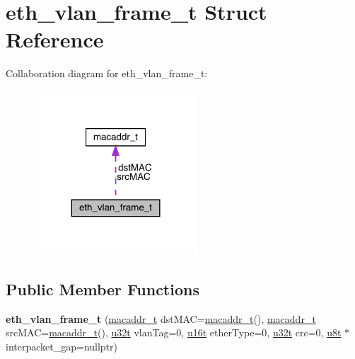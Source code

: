 \hypertarget{structeth__vlan__frame__t}{}\section{eth\+\_\+vlan\+\_\+frame\+\_\+t Struct Reference}
\label{structeth__vlan__frame__t}


Collaboration diagram for eth\+\_\+vlan\+\_\+frame\+\_\+t\+:\nopagebreak
\begin{figure}[H]
\begin{center}
\leavevmode
\includegraphics[width=173pt]{structeth__vlan__frame__t__coll__graph}
\end{center}
\end{figure}
\subsection*{Public Member Functions}
\begin{DoxyCompactItemize}
\item 
\mbox{\label{structeth__vlan__frame__t_afd8ff79bdc0fd97dd158d1b0e6842363}} 
{\bfseries eth\+\_\+vlan\+\_\+frame\+\_\+t} (\hyperlink{structmacaddr__t}{macaddr\+\_\+t} dst\+M\+AC=\hyperlink{structmacaddr__t}{macaddr\+\_\+t}(), \hyperlink{structmacaddr__t}{macaddr\+\_\+t} src\+M\+AC=\hyperlink{structmacaddr__t}{macaddr\+\_\+t}(), \hyperlink{macros_8h_a464a07ed2c6d005d677113cc44750a64}{u32t} vlan\+Tag=0, \hyperlink{macros_8h_a590a9a8f7df8fabfac6573e21da1922d}{u16t} ether\+Type=0, \hyperlink{macros_8h_a464a07ed2c6d005d677113cc44750a64}{u32t} crc=0, \hyperlink{macros_8h_a176a4ab0531a048e0693a4520c550193}{u8t} $\ast$interpacket\+\_\+gap=nullptr)
\end{DoxyCompactItemize}
